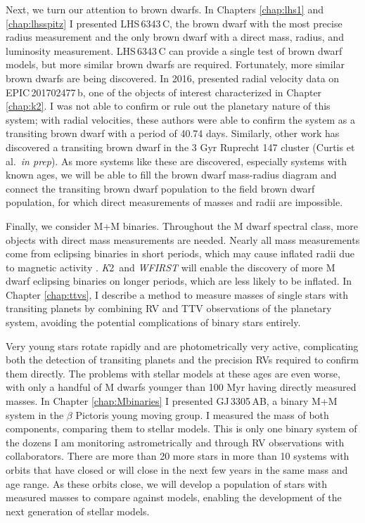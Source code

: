 \documentclass[12pt]{caltech_thesis}
\newcommand{\KT}{{\textit K2}}
\begin{document}
Next, we turn our attention to brown dwarfs.
In Chapters \ref{chap:lhs1} and \ref{chap:lhsspitz} I presented LHS\,6343\,C, the
brown dwarf with the most precise radius measurement and the only brown dwarf with a
direct mass, radius, and luminosity measurement.
LHS\,6343\,C can provide a single test of brown dwarf models, but more similar
brown dwarfs are required.
Fortunately, more similar brown dwarfs are being discovered. 
In 2016, \citet{Bayliss16} presented radial velocity data on EPIC\,201702477\,b,
one of the objects of interest characterized in Chapter \ref{chap:k2}. 
I was not able to confirm or rule out the planetary nature of this system;
with radial velocities, these authors were able to confirm the system as a transiting
brown dwarf with a period of 40.74 days.
Similarly, other work has discovered a transiting brown dwarf in the 3 Gyr Ruprecht 147
cluster (Curtis et al.\ \textit{in prep}). 
As more systems like these are discovered, especially systems with known ages, 
we will be able to fill the brown dwarf mass-radius diagram and connect the transiting
brown dwarf population to the field brown dwarf population, for which direct measurements
of masses and radii are impossible.


Finally, we consider M+M binaries. 
Throughout the M dwarf spectral class, more objects with direct mass measurements are
needed.
Nearly all mass measurements come from eclipsing binaries in short periods, which may
cause inflated radii due to magnetic activity \citep{Chabrier07, Jackson09}.
\KT\ and \textit{WFIRST} will enable the discovery of more M dwarf eclipsing binaries 
on longer periods, which are less likely to be inflated.
In Chapter \ref{chap:ttvs}, I describe a method to measure masses of single stars
with transiting planets by combining RV and TTV observations of the planetary system,
avoiding the potential complications of binary stars entirely.

Very young stars rotate rapidly and are photometrically very active, complicating both
the detection of transiting planets and the precision RVs required to confirm them 
directly.
The problems with stellar models at these ages are even worse, with only a handful of
M dwarfs younger than 100 Myr having directly measured masses.
In Chapter \ref{chap:Mbinaries} I presented GJ\,3305\,AB, a binary M+M system in the
$\beta$ Pictoris young moving group. 
I measured the mass of both components, comparing them to stellar models.
This is only one binary system of the dozens I am monitoring astrometrically and through
RV observations with collaborators. There are more than 20 more stars in more than 
10 systems with orbits that have closed or will close in the next few years in the same
mass and age range.
As these orbits close, we will develop a population of stars with measured masses to
compare against models, enabling the development of the next generation of stellar models.
\end{document}
